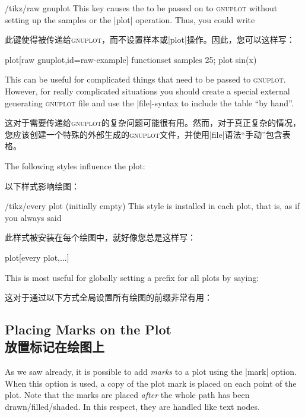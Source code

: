 \begin{key}{/tikz/raw gnuplot}
    This key causes the  to be passed on to
    \textsc{gnuplot} without setting up the samples or the |plot| operation.
    Thus, you could write

    此键使得被传递给\textsc{gnuplot}，而不设置样本或|plot|操作。因此，您可以这样写：
\begin{codeexample}
plot[raw gnuplot,id=raw-example] function{set samples 25; plot sin(x)}
\end{codeexample}
    This can be useful for complicated things that need to be passed to
    \textsc{gnuplot}. However, for really complicated situations you should
    create a special external generating \textsc{gnuplot} file and use the
    |file|-syntax to include the table ``by hand''.

    这对于需要传递给\textsc{gnuplot}的复杂问题可能很有用。然而，对于真正复杂的情况，您应该创建一个特殊的外部生成的\textsc{gnuplot}文件，并使用|file|语法“手动”包含表格。

\end{key}

The following styles influence the plot:

以下样式影响绘图：


\begin{stylekey}{/tikz/every plot (initially \normalfont empty)}
    This style is installed in each plot, that is, as if you always said
    
    此样式被安装在每个绘图中，就好像您总是这样写：
\begin{codeexample}
  plot[every plot,...]
\end{codeexample}
    This is most useful for globally setting a prefix for all plots by saying:
    
    这对于通过以下方式全局设置所有绘图的前缀非常有用：
\begin{codeexample}
\end{codeexample}
\end{stylekey}


\subsection{Placing Marks on the Plot\\放置标记在绘图上}

As we saw already, it is possible to add \emph{marks} to a plot using the
|mark| option. When this option is used, a copy of the plot mark is placed on
each point of the plot. Note that the marks are placed \emph{after} the whole
path has been drawn/filled/shaded. In this respect, they are handled like text
nodes.

